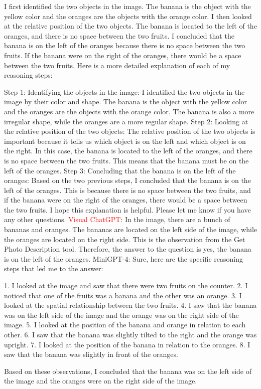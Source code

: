 \begin{enumerate}
        I first identified the two objects in the image. The banana is the object with the yellow color and the oranges are the objects with the orange color.
        I then looked at the relative position of the two objects. The banana is located to the left of the oranges, and there is no space between the two fruits.
        I concluded that the banana is on the left of the oranges because there is no space between the two fruits. If the banana were on the right of the oranges, there would be a space between the two fruits.
        Here is a more detailed explanation of each of my reasoning steps:
        
        Step 1: Identifying the objects in the image: I identified the two objects in the image by their color and shape. The banana is the object with the yellow color and the oranges are the objects with the orange color. The banana is also a more irregular shape, while the oranges are a more regular shape.
        Step 2: Looking at the relative position of the two objects: The relative position of the two objects is important because it tells us which object is on the left and which object is on the right. In this case, the banana is located to the left of the oranges, and there is no space between the two fruits. This means that the banana must be on the left of the oranges.
        Step 3: Concluding that the banana is on the left of the oranges: Based on the two previous steps, I concluded that the banana is on the left of the oranges. This is because there is no space between the two fruits, and if the banana were on the right of the oranges, there would be a space between the two fruits.
        I hope this explanation is helpful. Please let me know if you have any other questions.
        \subitem \textcolor{red}{Visual ChatGPT}: In the image, there are a bunch of bananas and oranges. The bananas are located on the left side of the image, while the oranges are located on the right side. This is the observation from the Get Photo Description tool. Therefore, the answer to the question is yes, the banana is on the left of the oranges.
        \subitem MiniGPT-4: Sure, here are the specific reasoning steps that led me to the answer:

        1. I looked at the image and saw that there were two fruits on the counter.
        2. I noticed that one of the fruits was a banana and the other was an orange.
        3. I looked at the spatial relationship between the two fruits.
        4. I saw that the banana was on the left side of the image and the orange was on the right side of the image.
        5. I looked at the position of the banana and orange in relation to each other.
        6. I saw that the banana was slightly tilted to the right and the orange was upright.
        7. I looked at the position of the banana in relation to the oranges.
        8. I saw that the banana was slightly in front of the oranges.
        
        Based on these observations, I concluded that the banana was on the left side of the image and the oranges were on the right side of the image.
    \end{enumerate}
